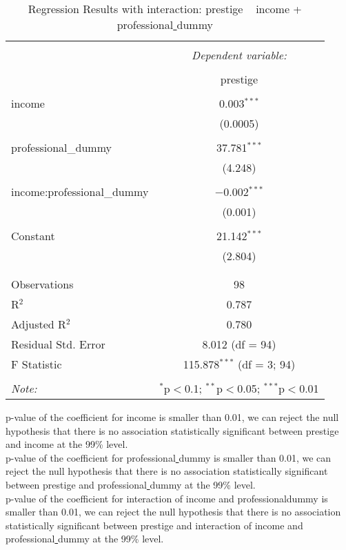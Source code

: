 \documentclass[12pt,letterpaper]{article}
\begin{document}
\begin{enumerate}
\begin{table}[!htbp] \centering 
	\caption{Regression Results with interaction: prestige ~ income + professional\underline{ }dummy} 
	\label{} 
	\begin{tabular}{@{\extracolsep{5pt}}lc} 
		\\[-1.8ex]\hline 
		\hline \\[-1.8ex] 
		& \multicolumn{1}{c}{\textit{Dependent variable:}} \\ 
		\cline{2-2} 
		\\[-1.8ex] & prestige \\ 
		\hline \\[-1.8ex] 
		income & 0.003$^{***}$ \\ 
		& (0.0005) \\ 
		& \\ 
		professional\_dummy & 37.781$^{***}$ \\ 
		& (4.248) \\ 
		& \\ 
		income:professional\_dummy & $-$0.002$^{***}$ \\ 
		& (0.001) \\ 
		& \\ 
		Constant & 21.142$^{***}$ \\ 
		& (2.804) \\ 
		& \\ 
		\hline \\[-1.8ex] 
		Observations & 98 \\ 
		R$^{2}$ & 0.787 \\ 
		Adjusted R$^{2}$ & 0.780 \\ 
		Residual Std. Error & 8.012 (df = 94) \\ 
		F Statistic & 115.878$^{***}$ (df = 3; 94) \\ 
		\hline 
		\hline \\[-1.8ex] 
		\textit{Note:}  & \multicolumn{1}{r}{$^{*}$p$<$0.1; $^{**}$p$<$0.05; $^{***}$p$<$0.01} \\ 
	\end{tabular} 
\end{table} 
	p-value of the coefficient for income is smaller than 0.01, we can reject the null hypothesis that there is no association statistically significant between prestige and income at the 99\% level.\\
	p-value of the coefficient for professional\underline{ }dummy is smaller than 0.01, we can reject the null hypothesis that there is no association statistically significant between prestige and professional\underline{ }dummy at the 99\% level.\\
	p-value of the coefficient for interaction of income and professional\underline{}dummy is smaller than 0.01, we can reject the null hypothesis that there is no association statistically significant between prestige and interaction of income and professional\underline{ }dummy at the 99\% level.
	

\end{enumerate}
\end{document}

